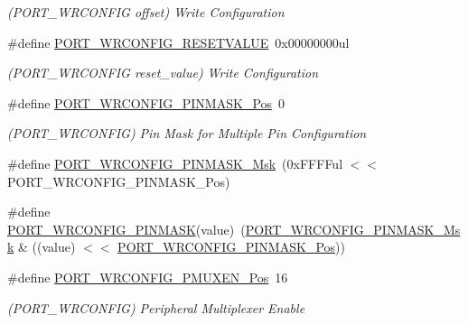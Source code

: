 \begin{DoxyCompactItemize}
\begin{DoxyCompactList}\small\item\em (P\+O\+R\+T\+\_\+\+W\+R\+C\+O\+N\+F\+IG offset) Write Configuration \end{DoxyCompactList}\item 
\#define \mbox{\hyperlink{group___s_a_m_d21___p_o_r_t_ga1962785a10daf1e85b2bab4203bc0f30}{P\+O\+R\+T\+\_\+\+W\+R\+C\+O\+N\+F\+I\+G\+\_\+\+R\+E\+S\+E\+T\+V\+A\+L\+UE}}~0x00000000ul
\begin{DoxyCompactList}\small\item\em (P\+O\+R\+T\+\_\+\+W\+R\+C\+O\+N\+F\+IG reset\+\_\+value) Write Configuration \end{DoxyCompactList}\item 
\#define \mbox{\hyperlink{group___s_a_m_d21___p_o_r_t_gab1a78a8f36fb7fceed5ec4b2f821670e}{P\+O\+R\+T\+\_\+\+W\+R\+C\+O\+N\+F\+I\+G\+\_\+\+P\+I\+N\+M\+A\+S\+K\+\_\+\+Pos}}~0
\begin{DoxyCompactList}\small\item\em (P\+O\+R\+T\+\_\+\+W\+R\+C\+O\+N\+F\+IG) Pin Mask for Multiple Pin Configuration \end{DoxyCompactList}\item 
\#define \mbox{\hyperlink{group___s_a_m_d21___p_o_r_t_ga55c432605b18507992b4540265c1768a}{P\+O\+R\+T\+\_\+\+W\+R\+C\+O\+N\+F\+I\+G\+\_\+\+P\+I\+N\+M\+A\+S\+K\+\_\+\+Msk}}~(0x\+F\+F\+F\+Ful $<$$<$ P\+O\+R\+T\+\_\+\+W\+R\+C\+O\+N\+F\+I\+G\+\_\+\+P\+I\+N\+M\+A\+S\+K\+\_\+\+Pos)
\item 
\#define \mbox{\hyperlink{group___s_a_m_d21___p_o_r_t_ga434339fe8cb966a1a3f96d1904e799a6}{P\+O\+R\+T\+\_\+\+W\+R\+C\+O\+N\+F\+I\+G\+\_\+\+P\+I\+N\+M\+A\+SK}}(value)~(\mbox{\hyperlink{group___s_a_m_d21___p_o_r_t_ga55c432605b18507992b4540265c1768a}{P\+O\+R\+T\+\_\+\+W\+R\+C\+O\+N\+F\+I\+G\+\_\+\+P\+I\+N\+M\+A\+S\+K\+\_\+\+Msk}} \& ((value) $<$$<$ \mbox{\hyperlink{group___s_a_m_d21___p_o_r_t_gab1a78a8f36fb7fceed5ec4b2f821670e}{P\+O\+R\+T\+\_\+\+W\+R\+C\+O\+N\+F\+I\+G\+\_\+\+P\+I\+N\+M\+A\+S\+K\+\_\+\+Pos}}))
\item 
\#define \mbox{\hyperlink{group___s_a_m_d21___p_o_r_t_gaafa832687961ca48e5dacadda81a6371}{P\+O\+R\+T\+\_\+\+W\+R\+C\+O\+N\+F\+I\+G\+\_\+\+P\+M\+U\+X\+E\+N\+\_\+\+Pos}}~16
\begin{DoxyCompactList}\small\item\em (P\+O\+R\+T\+\_\+\+W\+R\+C\+O\+N\+F\+IG) Peripheral Multiplexer Enable \end{DoxyCompactList}\item 

\end{DoxyCompactItemize}

